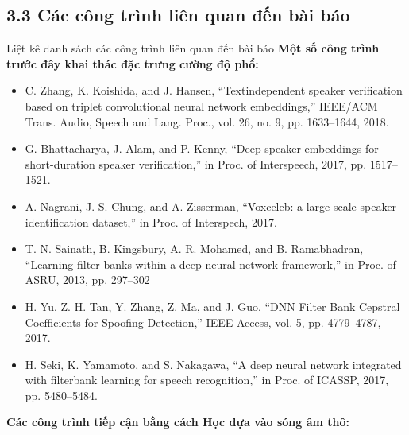 \documentclass{article}
\begin{document}
	\subsection{3.3 Các công trình liên quan đến bài báo}
	Liệt kê danh sách các công trình liên quan đến bài báo\newline
	\textbf{Một số công trình trước đây khai thác đặc trưng cường độ phổ:}
	\begin{itemize}
		\item C. Zhang, K. Koishida, and J. Hansen, “Textindependent speaker verification based on triplet convolutional neural network embeddings,” IEEE/ACM Trans. Audio, Speech and Lang. Proc., vol. 26, no. 9,
		pp. 1633–1644, 2018.
		
		\item G. Bhattacharya, J. Alam, and P. Kenny, “Deep speaker
		embeddings for short-duration speaker verification,” in
		Proc. of Interspeech, 2017, pp. 1517–1521.
		
		\item A. Nagrani, J. S. Chung, and A. Zisserman, “Voxceleb:
		a large-scale speaker identification dataset,” in Proc. of
		Interspech, 2017.
		
		\item T. N. Sainath, B. Kingsbury, A. R. Mohamed, and
		B. Ramabhadran, “Learning filter banks within a deep
		neural network framework,” in Proc. of ASRU, 2013,
		pp. 297–302
		
		\item H. Yu, Z. H. Tan, Y. Zhang, Z. Ma, and J. Guo, “DNN
		Filter Bank Cepstral Coefficients for Spoofing Detection,” IEEE Access, vol. 5, pp. 4779–4787, 2017.
		
		\item H. Seki, K. Yamamoto, and S. Nakagawa, “A deep
		neural network integrated with filterbank learning for
		speech recognition,” in Proc. of ICASSP, 2017, pp.
		5480–5484.
	\end{itemize}
	\textbf{Các công trình tiếp cận bằng cách Học dựa vào sóng âm thô:}
\end{document}
